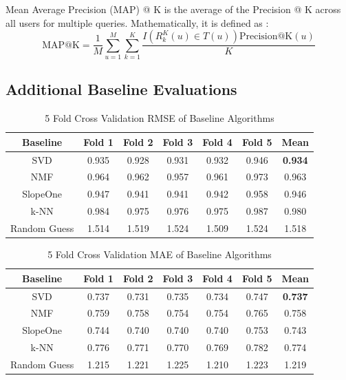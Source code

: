 \documentclass{article}
\begin{document}
Mean Average Precision (MAP) @ K is the average of the Precision @ K across all users for multiple queries. Mathematically, it is defined as \cite{survey}:
$$
\mbox{MAP@K} = \frac{1}{M} \sum_{u = 1}^M \sum_{k = 1}^K \frac{I(R^K_k(u) \in T(u)) \mbox{Precision@K}(u)}{K}
$$


\subsection{Additional Baseline Evaluations} \label{additional-baseline-eval}

\begin{table}[H]
    \centering
        \begin{tabular}{|c c c c c c c|} 
         \hline
         Baseline & Fold 1 & Fold 2 & Fold 3 & Fold 4 & Fold 5 & Mean \\ [0.5ex] 
         \hline\hline
         SVD & 0.935 & 0.928 & 0.931 & 0.932 & 0.946 & \bfseries 0.934 \\ 
         \hline
         NMF & 0.964 & 0.962 & 0.957 & 0.961 & 0.973 & 0.963 \\
         \hline
         SlopeOne & 0.947 & 0.941 & 0.941 & 0.942 & 0.958 & 0.946 \\
         \hline
         k-NN & 0.984 & 0.975 & 0.976 & 0.975 & 0.987 & 0.980 \\
         \hline
         Random Guess & 1.514 & 1.519 & 1.524 & 1.509 & 1.524 & 1.518 \\ [1ex] 
         \hline
        \end{tabular}
    \caption{5 Fold Cross Validation RMSE of Baseline Algorithms}
    \label{tab:rmse_results}
\end{table}

\begin{table}[H]
    \centering
        \begin{tabular}{|c c c c c c c|} 
         \hline
         Baseline & Fold 1 & Fold 2 & Fold 3 & Fold 4 & Fold 5 & Mean \\ [0.5ex] 
         \hline\hline
         SVD & 0.737 & 0.731 & 0.735 & 0.734 & 0.747 & \bfseries 0.737 \\ 
         \hline
         NMF & 0.759 & 0.758 & 0.754 & 0.754 & 0.765 & 0.758 \\
         \hline
         SlopeOne & 0.744 & 0.740 & 0.740 & 0.740 & 0.753 & 0.743 \\
         \hline
         k-NN & 0.776 & 0.771 & 0.770 & 0.769 & 0.782 & 0.774 \\
         \hline
         Random Guess & 1.215 & 1.221 & 1.225 & 1.210 & 1.223 & 1.219 \\ [1ex] 
         \hline
        \end{tabular}
    \caption{5 Fold Cross Validation MAE of Baseline Algorithms}
    \label{tab:mae_results}
\end{table}
\end{document}
